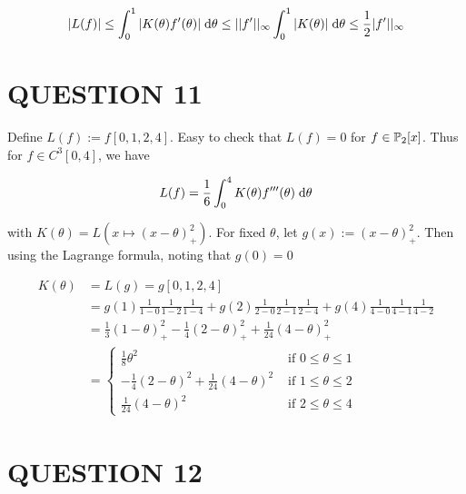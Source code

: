\documentclass[a4paper]{article}
\begin{document}
\[ | L(f) | \leq \int_{0}^{1} |  K(\theta) f'(\theta) | \; \d \theta \leq | | f'| |_{\infty} \int_{0}^{1} | K(\theta) | \; \d \theta \leq \frac{1}{2} | f'| |_{\infty} \]




\section{QUESTION 11}

Define $ L(f) :=  f[0,1,2,4] $. Easy to check that $ L(f) = 0 $ for $ f \in \P_{2}[x] $. Thus for $ f \in C^{3}[0,4] $, we have

\[ L(f) = \frac{1}{6} \int_{0}^{4} K(\theta)f'''(\theta) \; \d \theta   \]

with $ K(\theta) = L(x \mapsto (x - \theta)_{+}^{2} ) $. For fixed $ \theta $, let $ g(x) := (x - \theta)_{+}^{2} $. Then using the Lagrange formula, noting that $ g(0) = 0 $

\begin{align*}
K(\theta) & = L(g) = g[0,1,2,4] \\
& = g(1) \frac{1}{1 - 0} \frac{1}{1 - 2} \frac{1}{1 - 4} + g(2) \frac{1}{2 - 0} \frac{1}{2 - 1} \frac{1}{2-4} + g(4) \frac{1}{4 - 0} \frac{1}{4 - 1} \frac{1}{4 - 2} \\
& = \frac{1}{3} (1 - \theta)_{+}^{2} - \frac{1}{4} (2 - \theta)_{+}^{2} + \frac{1}{24} (4 - \theta)_{+}^{2} \\
& = \begin{cases}  \frac{1}{8} \theta^{2} & \text{ if } 0 \leq \theta \leq 1 \\ - \frac{1}{4} (2 - \theta)^{2} + \frac{1}{24} (4 - \theta)^{2}  & \text{ if } 1 \leq \theta \leq 2 \\  \frac{1}{24} (4 - \theta)^{2} & \text{ if } 2 \leq \theta \leq 4 \end{cases}
\end{align*}

\begin{center}
\end{center}






\section{QUESTION 12}
\end{document}
